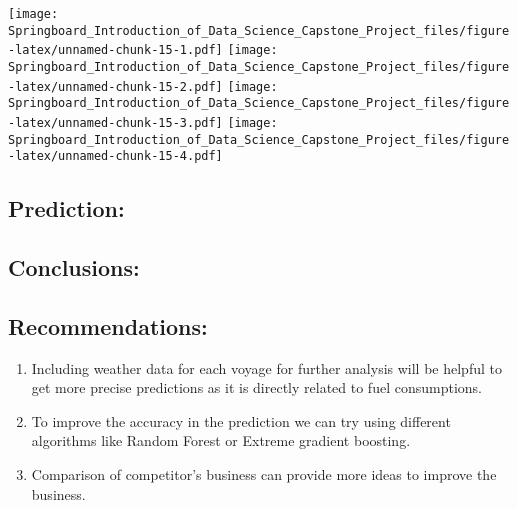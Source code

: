 \documentclass[]{article}
\newenvironment{Shaded}{\begin{snugshade}}{\end{snugshade}}
\newcommand{\CommentTok}[1]{\textcolor[rgb]{0.56,0.35,0.01}{\textit{#1}}}
\providecommand{\tightlist}{%
  \setlength{\itemsep}{0pt}\setlength{\parskip}{0pt}}
\begin{document}
\texttt{[image: Springboard\_Introduction\_of\_Data\_Science\_Capstone\_Project\_files/figure-latex/unnamed-chunk-15-1.pdf]}
\texttt{[image: Springboard\_Introduction\_of\_Data\_Science\_Capstone\_Project\_files/figure-latex/unnamed-chunk-15-2.pdf]}
\texttt{[image: Springboard\_Introduction\_of\_Data\_Science\_Capstone\_Project\_files/figure-latex/unnamed-chunk-15-3.pdf]}
\texttt{[image: Springboard\_Introduction\_of\_Data\_Science\_Capstone\_Project\_files/figure-latex/unnamed-chunk-15-4.pdf]}

\subsection{\texorpdfstring{\textbf{Prediction:}}{Prediction:}}\label{prediction}

\begin{Shaded}
\end{Shaded}

\subsection{\texorpdfstring{\textbf{Conclusions:}}{Conclusions:}}\label{conclusions}

\subsection{\texorpdfstring{\textbf{Recommendations:}}{Recommendations:}}\label{recommendations}

\begin{enumerate}
\def\labelenumi{\arabic{enumi}.}
\tightlist
\item
  Including weather data for each voyage for further analysis will be
  helpful to get more precise predictions as it is directly related to
  fuel consumptions.\\
\item
  To improve the accuracy in the prediction we can try using different
  algorithms like Random Forest or Extreme gradient boosting.\\
\item
  Comparison of competitor's business can provide more ideas to improve
  the business.
\end{enumerate}
\end{document}
